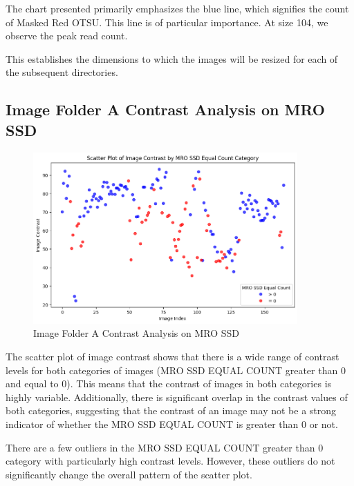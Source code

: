 The chart presented primarily emphasizes the blue line, which signifies the count of Masked Red OTSU. This line is of particular importance. At size 104, we observe the peak read count.

This establishes the dimensions to which the images will be resized for each of the subsequent directories.

\newpage




\newpage

\subsection{Image Folder A Contrast Analysis on MRO SSD}

\begin{figure}[ht]
    \centering
    \includegraphics[width=0.9\textwidth]{Figures/Results/sipa_02/contrast.png}
    \caption[Image Folder A Contrast Analysis on MRO SSD]{Image Folder A Contrast Analysis on MRO SSD}
    \label{fig:Image Folder A Contrast Analysis on MRO SSD}
\end{figure}

The scatter plot of image contrast shows that there is a wide range of contrast levels for both categories of images (MRO SSD EQUAL COUNT greater than 0 and equal to 0). This means that the contrast of images in both categories is highly variable. Additionally, there is significant overlap in the contrast values of both categories, suggesting that the contrast of an image may not be a strong indicator of whether the MRO SSD EQUAL COUNT is greater than 0 or not.

There are a few outliers in the MRO SSD EQUAL COUNT greater than 0 category with particularly high contrast levels. However, these outliers do not significantly change the overall pattern of the scatter plot.

